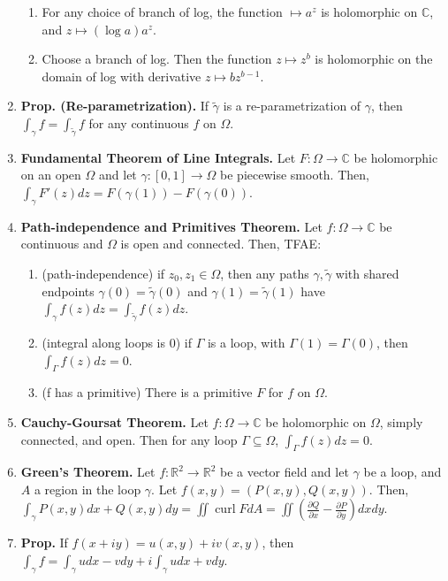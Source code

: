 \documentclass[11pt]{article}
\theoremstyle{definition}
\theoremstyle{named}
\DeclareMathOperator{\curl}{curl}
\begin{document}
\begin{enumerate}
\begin{enumerate}
        \item For any choice of branch of log, the function $\mapsto a^z$ is holomorphic on $\mathbb{C}$, and $z \mapsto (\log a) a^z$. 
        \item Choose a branch of log. Then the function $z \mapsto z^b$ is holomorphic on the domain of log with derivative $z \mapsto bz^{b-1}$. 
    \end{enumerate}
    \item \textbf{Prop. (Re-parametrization). } If $\tilde{\gamma}$ is a re-parametrization of $\gamma$, then $\int_{\gamma} f = \int_{\tilde{\gamma}} f$ for any continuous $f$ on $\Omega$. 
    \item \textbf{Fundamental Theorem of Line Integrals. } Let $F: \Omega \to \mathbb{C}$ be holomorphic on an open $\Omega$ and let $\gamma: [0,1] \to \Omega$ be piecewise smooth. Then, $\int_{\gamma} F'(z) dz = F(\gamma(1)) - F(\gamma(0))$. 
    \item \textbf{Path-independence and Primitives Theorem. } Let $f: \Omega \to \mathbb{C}$ be continuous and $\Omega$ is open and connected. Then, TFAE: 
    \begin{enumerate}
        \item (path-independence) if $z_0, z_1 \in \Omega$, then any paths $\gamma, \tilde{\gamma}$ with shared endpoints $\gamma(0) = \tilde{\gamma}(0)$ and $\gamma(1) = \tilde{\gamma}(1)$ have $\int_{\gamma} f(z) dz = \int_{\tilde{\gamma}} f(z) dz$. 
        \item (integral along loops is 0) if $\Gamma$ is a loop, with $\Gamma(1) = \Gamma(0)$, then $\int_{\Gamma} f(z) dz = 0$. 
        \item (f has a primitive) There is a primitive $F$ for $f$ on $\Omega$.  
    \end{enumerate}
    \item \textbf{Cauchy-Goursat Theorem. } Let $f: \Omega \to \mathbb{C}$ be holomorphic on $\Omega$, simply connected, and open. Then for any loop $\Gamma \subseteq \Omega$, $\int_{\Gamma} f(z) dz = 0$. 
    \item \textbf{Green's Theorem. } Let $f: \mathbb{R}^2 \to \mathbb{R}^2$ be a vector field and let $\gamma$ be a loop, and $A$ a region in the loop $\gamma$. Let $f(x,y) = (P(x,y), Q(x,y))$. Then, $\int_{\gamma} P(x,y) dx + Q(x,y) dy = \iint \curl F  dA = \iint \left(\frac{\partial Q}{\partial x} - \frac{\partial P}{\partial y}\right) dxdy$. 
    \item \textbf{Prop. } If $f(x+iy) = u(x,y) + iv(x,y)$, then $\int_{\gamma} f = \int_{\gamma} udx - vdy + i\int_\gamma u dx + vdy$. 

\end{enumerate}
\end{document}
